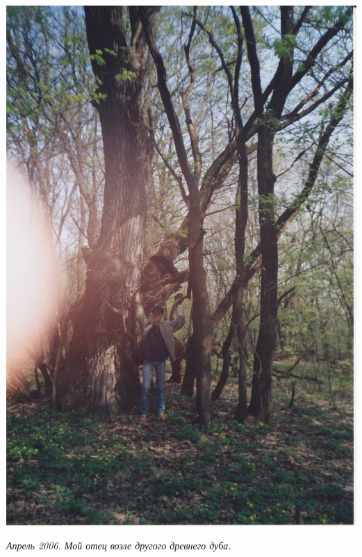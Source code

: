 \begin{center}
\includegraphics[width=\textwidth]{chast-lys-gory/zazver/stardub03.jpg}

\textit{Апрель 2006. Мой отец возле другого древнего дуба.}
\end{center}

\vspace*{\fill}
\newpage

\newpage

